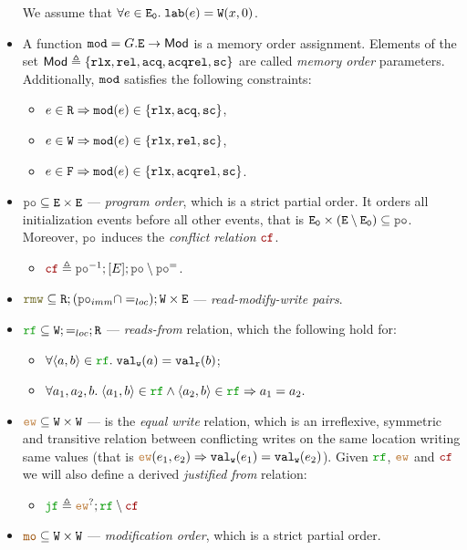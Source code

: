 \documentclass[12pt]{article}
\begin{document}
\begin{definition}
\begin{itemize}
    We assume that $\forall{e} \in {\mathtt{E_0}}. \; {\mathtt{lab}}(e) = {\mathtt{W}}({x},{0})$.
  \item A function ${\mathtt{mod}} = G.{\mathtt{E}} \rightarrow \mathsf{Mod}$ is a memory order assignment.
    Elements of the set $\mathsf{Mod} \triangleq \{ \mathtt{rlx}, {\mathtt{rel}}, {\mathtt{acq}}, {\mathtt{acqrel}}, {\mathtt{sc}} \}$ are
    called \emph{memory order} parameters.
    Additionally, ${\mathtt{mod}}$ satisfies the following constraints:
    \begin{itemize}
    \item $e \in {\mathtt{R}} \Rightarrow {\mathtt{mod}}(e) \in \{ \mathtt{rlx}, {\mathtt{acq}}, {\mathtt{sc}} \}$,
    \item $e \in {\mathtt{W}} \Rightarrow {\mathtt{mod}}(e) \in \{ \mathtt{rlx}, {\mathtt{rel}}, {\mathtt{sc}} \}$,
    \item $e \in {\mathtt{F}} \Rightarrow {\mathtt{mod}}(e) \in \{ \mathtt{rlx}, {\mathtt{acqrel}}, {\mathtt{sc}} \}$.
    \end{itemize}
  \item $\lPO \subseteq \lE \times \lE$ --- \emph{program order}, which is a strict partial order.
    It orders all initialization events before all other events,
    that is $\lEi \times (\lE \setminus \lEi) \subseteq \lPO$.
    Moreover, $\lPO$ induces the \emph{conflict relation} $\lCF$.
    \begin{itemize}
      \item  $\lCF \defeq \lPO^{-1};[E];\lPO \setminus \lPO^{=}$.
    \end{itemize}
  \item $\lRMW \subseteq \lR;(\lPO_{imm} \cap =_{loc});\lW \times \lE$ ---
    \emph{read-modify-write pairs}.
  \item $\lRF \subseteq \lW; =_{loc}; \lR$ --- \emph{reads-from} relation, which the following
    hold for:
    \begin{itemize}
    \item $\forall{\tup{a, b}} \in \lRF. \; \lVALW(a) = \lVALR(b)$;
    \item $\forall{a_1, a_2, b}. \; \tup{a_1, b} \in \lRF \wedge \tup{a_2, b} \in \lRF \Rightarrow a_1 = a_2.$
    \end{itemize}
  \item $\lEW \subseteq \lW \times \lW$ --- is the \emph{equal write} relation, 
    which is an irreflexive, symmetric and transitive relation between conflicting writes on the
    same location writing same values 
    (that is $\lEW(e_1, e_2) \Rightarrow \lVALW(e_1) = \lVALW(e_2)$).
    Given $\lRF$, $\lEW$ and $\lCF$ we will also define a derived \emph{justified from} relation:
    \begin{itemize}
      \item $\lJF \defeq \lEW^?;\lRF \setminus \lCF$
    \end{itemize}
  \item $\lMO \subseteq \lW \times \lW$ --- \emph{modification order}, which is a strict partial order.
  \end{itemize}
\end{definition}
\end{document}
